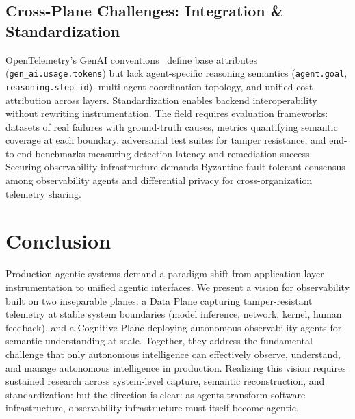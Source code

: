 \documentclass[sigplan,screen,9pt]{acmart}
\begin{document}
\subsection{Cross-Plane Challenges: Integration \& Standardization}

OpenTelemetry's GenAI conventions~\cite{otelgenai,semconv} define base attributes (\texttt{gen\_ai.usage.tokens}) but lack agent-specific reasoning semantics (\texttt{agent.goal}, \texttt{reasoning.step\_id}), multi-agent coordination topology, and unified cost attribution across layers. Standardization enables backend interoperability without rewriting instrumentation. The field requires evaluation frameworks: datasets of real failures with ground-truth causes, metrics quantifying semantic coverage at each boundary, adversarial test suites for tamper resistance, and end-to-end benchmarks measuring detection latency and remediation success. Securing observability infrastructure demands Byzantine-fault-tolerant consensus among observability agents and differential privacy for cross-organization telemetry sharing.

\section{Conclusion}

Production agentic systems demand a paradigm shift from application-layer instrumentation to unified agentic interfaces. We present a vision for observability built on two inseparable planes: a Data Plane capturing tamper-resistant telemetry at stable system boundaries (model inference, network, kernel, human feedback), and a Cognitive Plane deploying autonomous observability agents for semantic understanding at scale. Together, they address the fundamental challenge that only autonomous intelligence can effectively observe, understand, and manage autonomous intelligence in production. Realizing this vision requires sustained research across system-level capture, semantic reconstruction, and standardization: but the direction is clear: as agents transform software infrastructure, observability infrastructure must itself become agentic.




\end{document}
